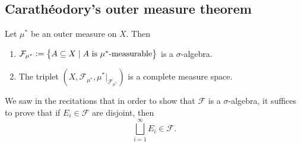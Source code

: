 \documentclass[11pt,a4paper]{article}
\begin{document}
\subsection{Carath\'eodory's outer measure theorem}

\begin{theorem}
  \label{thm:car-outer-measure}
  Let $\mu^*$ be an outer measure on $X$. Then
  \begin{enumerate}
    \item[(1)] $\mathcal F_{\mu^*} := 
      \left\{A \subseteq X \mid A \text{ is }\mu^*\text{-measurable}\right\}$ is a 
      $\sigma$-algebra.
    \item[(2)] The triplet
      $(X, \mathcal F_{\mu^*}, \mu^*\vert_{\mathcal F_{\mu^*}})$
      is a complete measure space.
  \end{enumerate}
\end{theorem}
\begin{remark} \label{recitations-one}
  We saw in the recitations that in order
  to show that $\mathcal F$ is a $\sigma$-algebra, it suffices to prove that
  if $E_i \in \mathcal F$ are disjoint, then
  \[
    \bigsqcup_{i=1}^{\infty} E_i \in \mathcal F.
  \]
\end{remark}
\end{document}
